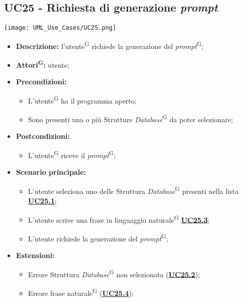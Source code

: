 \subsection{UC25 - Richiesta di generazione \textit{prompt}}
\label{sec:UC25X}
\texttt{[image: UML\_Use\_Cases/UC25.png]}
\begin{itemize}
	\item \textbf{Descrizione:} l’utente\textsuperscript{G} richiede la generazione del \textit{prompt}\textsuperscript{G};
	\item \textbf{Attori\textsuperscript{G}:} utente;
	\item \textbf{Precondizioni:}
	\begin{itemize}
		\item L’utente\textsuperscript{G} ha il programma aperto;
		\item Sono presenti una o più Strutture \textit{Database}\textsuperscript{G} da poter selezionare;
	\end{itemize}
	\item \textbf{Postcondizioni:}
	\begin{itemize}
		\item L’utente\textsuperscript{G} riceve il \textit{prompt}\textsuperscript{G};
	\end{itemize}
	\item \textbf{Scenario principale:}
	\begin{itemize}
		\item L’utente seleziona uno delle Struttura \textit{Database}\textsuperscript{G} presenti nella lista  \hyperref[sec:UC25.1]{\textbf{UC25.1}};
		\item L'utente scrive una frase in linguaggio naturale\textsuperscript{G}  \hyperref[sec:UC25.3]{\textbf{UC25.3}};
		\item L'utente richiede la generazione del \textit{prompt}\textsuperscript{G};
	\end{itemize}
	\item \textbf{Estensioni:}
	\begin{itemize}
		\item Errore Struttura \textit{Database}\textsuperscript{G} non selezionata (\hyperref[sec:UC25.2]{\textbf{UC25.2}});
		\item Errore frase naturale\textsuperscript{G} (\hyperref[sec:UC25.4]{\textbf{UC25.4}});
	\end{itemize}
\end{itemize}

